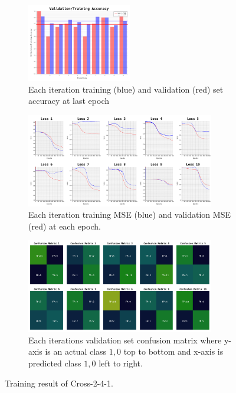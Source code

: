 \documentclass{article}
\begin{document}
\begin{figure}[ht]
	\begin{subfigure}{\textwidth}
		\centering
		\includegraphics[width=0.5\textwidth]{cross-2-4-1_2/acc}
		\caption{Each iteration training (blue) and validation (red) set accuracy at last epoch}
	\end{subfigure}
	\begin{subfigure}{\textwidth}
		\centering
		\includegraphics[width=0.9\textwidth]{cross-2-4-1_2/loss}
		\caption{Each iteration training MSE (blue) and validation MSE (red) at each epoch.}
	\end{subfigure}
	\begin{subfigure}{\textwidth}
		\centering
		\includegraphics[width=0.9\textwidth]{cross-2-4-1_2/confusion_matrix}
		\caption{Each iterations validation set confusion matrix where y-axis is an actual class $1, 0$ top to bottom and x-axis is predicted class $1, 0$ left to right.}
	\end{subfigure}
	\caption{Training result of Cross-2-4-1.}
	\label{fig:8}
\end{figure}
\FloatBarrier
\end{document}
